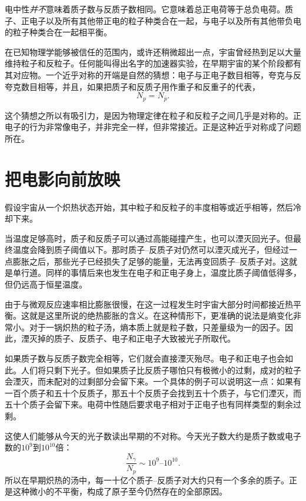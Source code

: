 电中性\emph{并不}意味着质子数与反质子数相同。它意味着总正电荷等于总负电荷。质子、正电子以及所有其他带正电的粒子种类合在一起，与电子以及所有其他带负电的粒子种类合在一起相平衡。

在已知物理学能够被信任的范围内，或许还稍微超出一点，宇宙曾经热到足以大量维持粒子和反粒子。任何能叫得出名字的加速器实验，在早期宇宙的某个阶段都有其对应物。一个近乎对称的开端是自然的猜想：电子与正电子数目相等，夸克与反夸克数目相等，并且，如果把质子和反质子用作重子和反重子的代表，
\[
N_p = N_{\bar p}.
\]

这个猜想之所以有吸引力，是因为物理定律在粒子和反粒子之间几乎是对称的。正电子的行为非常像电子，并非完全一样，但非常接近。正是这种近乎对称成了问题所在。

\section{把电影向前放映}

假设宇宙从一个炽热状态开始，其中粒子和反粒子的丰度相等或近乎相等，然后冷却下来。

当温度足够高时，质子和反质子可以通过高能碰撞产生，也可以湮灭回光子。但最终温度会降到质子阈值以下。那时质子--反质子对仍然可以湮灭成光子，但经过一点膨胀之后，那些光子已经损失了足够的能量，无法再变回质子--反质子对。这就是单行道。同样的事情后来也发生在电子和正电子身上，温度比质子阈值低得多，但仍远高于恒星温度。

由于与微观反应速率相比膨胀很慢，在这一过程发生时宇宙大部分时间都接近热平衡。这就是这里所说的绝热膨胀的含义。在这种情形下，更准确的说法是熵变化非常小。对于一锅炽热的粒子汤，熵本质上就是粒子数，只差量级为一的因子。因此，湮灭掉的质子、反质子、电子和正电子大致被光子所取代。

如果质子数与反质子数完全相等，它们就会直接湮灭殆尽。电子和正电子也会如此。人们将只剩下光子。但如果质子比反质子哪怕只有极微小的过剩，成对的粒子会湮灭，而未配对的过剩部分会留下来。一个具体的例子可以说明这一点：如果有一百个质子和五十个反质子，那五十个反质子会找到五十个质子，与它们湮灭，而五十个质子会留下来。电荷中性随后要求电子相对于正电子也有同样类型的剩余过剩。

这使人们能够从今天的光子数读出早期的不对称。今天光子数大约是质子数或电子数的\(10^9\)到\(10^{10}\)倍：
\[
\frac{N_\gamma}{N_p} \sim 10^9\text{--}10^{10}.
\]
所以在早期炽热的汤中，每一十亿个质子--反质子对大约只有一个多余的质子。正是这种微小的不平衡，构成了原子至今仍然存在的全部原因。

\begin{classroomqa}
\end{classroomqa}


